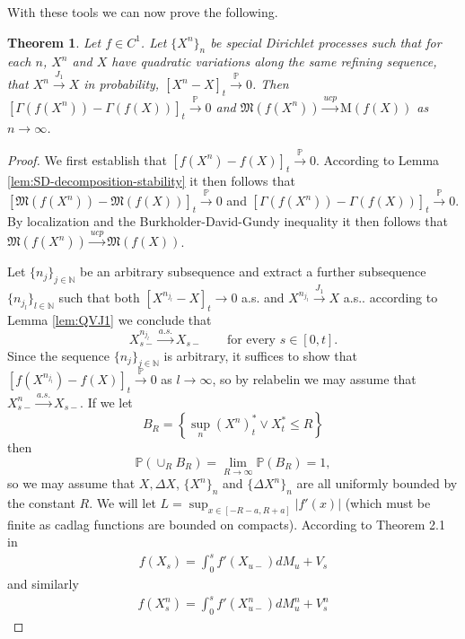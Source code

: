 \documentclass[a4paper,10pt]{article}
\newtheorem{thm}{Theorem}[section]
\def\P{{\mathbb{P}}}
\def\N{{\mathbb{N}}}
\begin{document}
With these tools we can now prove the following.
\begin{thm}\label{C1}
Let $f\in C^1$. Let $\{X^n\}_n$ be special Dirichlet processes such that for each $n$, $X^n$ and $X$ have quadratic variations along the same refining sequence, that $X^n\xrightarrow{J_1}X$ in probability, $[X^n-X]_t\xrightarrow{\P}0$. Then
\\$[\mathfrak{\Gamma}(f(X^n))-\mathfrak{\Gamma}(f(X))]_t \xrightarrow{\P} 0$ and $\mathfrak{M}(f(X^n))\xrightarrow{ucp}\mathrm{M}(f(X))$ as $n\to \infty$.
\end{thm}
\begin{proof}
We first establish that $[f(X^n)-f(X)]_t\xrightarrow{\P}0$. According to Lemma \ref{lem:SD-decomposition-stability} it then follows that $[\mathfrak{M}(f(X^n))-\mathfrak{M}(f(X))]_t\xrightarrow{\P}0$ and $[\mathfrak{\Gamma}(f(X^n))-\mathfrak{\Gamma}(f(X))]_t\xrightarrow{\P}0$. By localization and the Burkholder-David-Gundy inequality it then follows that $\mathfrak{M}(f(X^n))\xrightarrow{ucp}\mathfrak{M}(f(X))$. 

Let $\{n_j\}_{j\in\N}$ be an arbitrary subsequence and extract a further subsequence $\{n_{j_l}\}_{l\in\N}$ such that both
$
[X^{n_{j_l}}-X]_t\to 0
$ a.s.
and
$
X^{n_{j_l}}\xrightarrow{J_1}X
$ a.s.. according to Lemma \ref{lem:QVJ1} we conclude that
\[
X^{n_{j_l}}_{s-}\xrightarrow{a.s.}X_{s-}
\qquad\text{for every } s\in[0,t].
\]
Since the sequence $\{n_j\}_{j\in\N}$ is arbitrary, it suffices to show that $[f(X^{n_{j_l}})-f(X)]_t\xrightarrow{\P}0$ as $l\to \infty$, so by relabelin we may assume that $X^{n}_{s-}\xrightarrow{a.s.}X_{s-}$. If we let 
$$B_R=\left\{\sup_n(X^n)^*_t\vee X^*_t\le R\right\}$$ 
then 
$$\P\left(\cup_{R} B_R\right)=\lim_{R\to\infty}\P(B_R)=1,$$ 
so we may assume that $X,\Delta X$, $\{X^n\}_n$ and $\{\Delta X^n\}_n$ are all uniformly bounded by the constant $R$.  We will let $L=\sup_{x\in[-R-a,R+a]} |f'(x)|$ (which must be finite as cadlag functions are bounded on compacts).
According to Theorem 2.1 in \cite{Low}	
\begin{align*}
f(X_s)=\int_0^sf'(X_{u-})dM_u+V_s
\end{align*}
and similarly
\begin{align*}
f(X^n_s)=\int_0^sf'(X^n_{u-})dM^n_u+V^n_s
\end{align*}


\end{proof}
\end{document}
